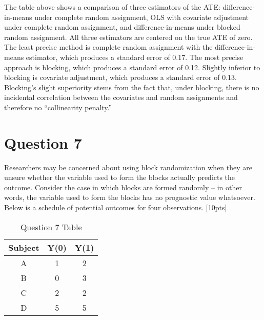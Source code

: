 \documentclass[11pt,notitlepage]{article}\usepackage[]{graphicx}\usepackage[]{color}
\begin{document}
\begin{enumerate}[a)]
The table above shows a comparison of three estimators of the ATE: difference-in-means under complete random assignment, OLS with covariate adjustment under complete random assignment, and difference-in-means under blocked random assignment. All three estimators are centered on the true ATE of zero. The least precise method is complete random assignment with the difference-in-means estimator, which produces a standard error of 0.17.  The most precise approach is blocking, which produces a standard error of 0.12.  Slightly inferior to blocking is covariate adjustment, which produces a standard error of 0.13. Blocking's slight superiority stems from the fact that, under blocking, there is no incidental correlation between the covariates and random assignments and therefore no ``collinearity penalty.''

\end{enumerate}

\section*{Question 7}
Researchers may be concerned about using block randomization when they are unsure whether the variable used to form the blocks actually predicts the outcome. Consider the case in which blocks are formed randomly -- in other words, the variable used to form the blocks has no prognostic value whatsoever. Below is a schedule of potential outcomes for four observations. [10pts]

\begin{table}[H]
  \centering
  \caption{Question 7 Table}
    \begin{tabular}{ccc}
    \toprule
    Subject & Y(0)  & Y(1) \\
    \midrule
    A     & 1     & 2 \\
    B     & 0     & 3 \\
    C     & 2     & 2 \\
    D     & 5     & 5 \\
    \bottomrule
    \end{tabular}%
  \label{tab:addlabel}%
\end{table}%
\end{document}
